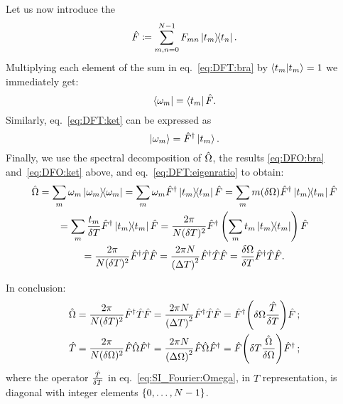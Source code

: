 Let us now introduce the 
\begin{equation}
  \hat{F} \coloneqq \sum_{m,n=0}^{N-1} F_{mn} \ketbra{t_m}{t_n} \text{.}
\end{equation}
Multiplying each element of the sum in eq.~\eqref{eq:DFT:bra}
by $\braket{t_m} = 1$
we immediately get:
\begin{equation}\label{eq:DFO:bra}
  \bra{\omega_{m}} =
  \bra{t_m} \hat{F} \text{.}
\end{equation}
Similarly, eq.~\eqref{eq:DFT:ket} can be expressed as
\begin{equation}
  \label{eq:DFO:ket}  \ket{\omega_{m}} = \hat{F}^{\dagger} \ket{t_m} \text{.}
\end{equation}
%
Finally, we use the spectral decomposition of $\hat{\Omega}$,
the results \eqref{eq:DFO:bra} and~\eqref{eq:DFO:ket} above,
and eq.~\eqref{eq:DFT:eigenratio}
to obtain:
\begin{multline}\label{eq:DFT:OmegaFTF}
  \hat{\Omega} = \sum_{m} \omega_{m} \ketbra{\omega_{m}} =
  \sum_{m} \omega_{m} \hat{F}^{\dagger} \ketbra{t_{m}} \hat{F} =
  \sum_{m} m \qty(\delta\Omega) \hat{F}^{\dagger} \ketbra{t_{m}} \hat{F}
  \\
  = \sum_{m} \frac{t_m}{\delta{T}} \hat{F}^{\dagger} \ketbra{t_{m}} \hat{F}
  = \frac{2\pi}{N(\delta{T})^{2}} \hat{F}^{\dagger} \left(\sum_{m}t_{m}\ketbra{t_{m}}\right) \hat{F}
  \\
  =
  \frac{2\pi}{N(\delta{T})^{2}} \hat{F}^{\dagger} \hat{T} \hat{F} =
  \frac{2\pi N}{\qty(\Delta T)^2} \hat{F}^{\dagger} \hat{T} \hat{F} = \frac{\delta\Omega}{\delta{T}} \hat{F}^{\dagger} \hat{T} \hat{F}
  \text{.}
\end{multline}

In conclusion:
\begin{gather}
  \label{eq:SI_Fourier:Omega}
    \hat{\Omega} =
      \frac{2\pi}{N(\delta T)^2}          \hat{F}^{\dagger} \hat{T} \hat{F} =
      \frac{2\pi N}{\qty(\Delta T)^2}     \hat{F}^{\dagger} \hat{T} \hat{F} =
      \hat{F}^{\dagger} \qty(\delta{\Omega} \frac{\hat{T}}{\delta{T}}) \hat{F}
      \, \text{;}
      \\
  \label{eq:SI_Fourier:T}
    \hat{T} =
      \frac{2\pi}{N(\delta\Omega)^2}      \hat{F} \hat{\Omega} \hat{F}^{\dagger} =
      \frac{2\pi N}{\qty(\Delta\Omega)^2} \hat{F} \hat{\Omega} \hat{F}^{\dagger} =
      \hat{F} \qty(\delta{T} \frac{\hat{\Omega}}{\delta{\Omega}}) \hat{F}^{\dagger}
      \, \text{;}
\end{gather}
where the operator $\frac{\hat{T}}{\delta{T}}$ in eq.~\eqref{eq:SI_Fourier:Omega},
in $T$ representation, is diagonal with integer elements $\left\{0, \dots, N-1\right\}$.

